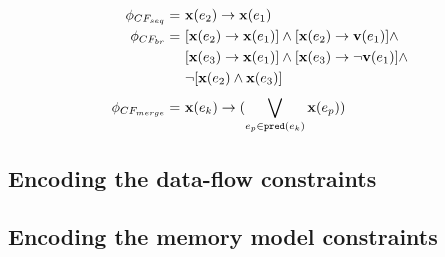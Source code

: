 \begin{align}
\phi_{CF_{seq}}   = \ & \mathbf{x}(e_2) \rightarrow \mathbf{x}(e_1) \label{enc:cf:seq} \\
\phi_{CF_{br}}    = \ & [\mathbf{x}(e_2) \rightarrow \mathbf{x}(e_1)] \land [\mathbf{x}(e_2) \rightarrow \mathbf{v}(e_1)] \land \nonumber \\
				  & [\mathbf{x}(e_3) \rightarrow \mathbf{x}(e_1)] \land [\mathbf{x}(e_3) \rightarrow \lnot\mathbf{v}(e_1)] \land \nonumber \\
				  & \lnot [\mathbf{x}(e_2) \land \mathbf{x}(e_3)]  \label{enc:cf:br} \\
\phi_{CF_{merge}} = \ & \mathbf{x}(e_k) \rightarrow (\bigvee\limits_{e_p \in \mathtt{pred}(e_k)}^{} \mathbf{x}(e_p)) \label{enc:cf:merge}
\end{align}

\subsection{Encoding the data-flow constraints}
\label{ch:port:enc:df}



\subsection{Encoding the memory model constraints}
\label{ch:port:enc:wmm}

